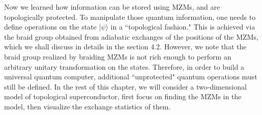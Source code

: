 \documentclass[11pt, oneside]{book}
\theoremstyle{break}
\theoremstyle{break}
\begin{document}
Now we learned how information can be stored using MZMs, and are topologically protected. To manipulate those quantum information, one needs to define operations on the state $|\psi\rangle$ in a ``topological fashion." This is achieved via the braid group obtained from adiabatic exchanges of the positions of the MZMs, which we shall discuss in details in the section 4.2. However, we note that the braid group realized by braiding MZMs is not rich enough to perform an arbitrary unitary transformation on the states. Therefore, in order to build a universal quantum computer, additional ``unprotected" quantum operations must still be defined. In the rest of this chapter, we will consider a two-dimensional model of topological superconductor, first focus on finding the MZMs in the model, then visualize the exchange statistics of them.\\
\end{document}
